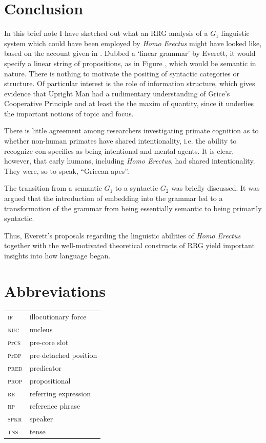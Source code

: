 \documentclass[output=paper,colorlinks,citecolor=brown]{langscibook}
\begin{document}
\section{Conclusion}\label{sec:vanvalin:6}
In this brief note I have sketched out what an RRG analysis of a $G_1$ linguistic system which could have been employed by \emph{Homo Erectus} might have looked like, based on the account given in \citet{everett2017language}.  Dubbed a ‘linear grammar’ by Everett, it would specify a linear string of propositions, as in Figure , which would be semantic in nature.  There is nothing to motivate the positing of syntactic categories or structure.  Of particular interest is the role of information structure, which gives evidence that Upright Man had a rudimentary understanding of Grice’s Cooperative Principle and at least the the maxim of quantity, since it underlies the important notions of topic and focus.  

There is little agreement among researchers investigating primate cognition as to whether non-human primates have shared intentionality, i.e. the ability to recognize con-specifics as being intentional and mental agents.  It is clear, however, that early humans, including \emph{Homo Erectus}, had shared intentionality.  They were, so to speak, “Gricean apes”.

The transition from a semantic $G_1$ to a syntactic $G_2$ was briefly discussed.  It was argued that the introduction of embedding into the grammar led to a transformation of the grammar from being essentially semantic to being primarily syntactic.

Thus, Everett’s proposals regarding the linguistic abilities of \emph{Homo Erectus} together with the well-motivated theoretical constructs of RRG yield important insights into how language began.

\section*{Abbreviations}
\begin{tabularx}{.5\textwidth}{@{}lQ@{}}
\textsc{if} & illocutionary force \\
\textsc{nuc} & nucleus \\
\textsc{p}r\textsc{cs} & pre-core slot \\
\textsc{p}r\textsc{dp} & pre-detached position \\
\textsc{pred} & predicator \\
\textsc{prop} & propositional \\
\textsc{re} & referring expression \\
\textsc{rp} & reference phrase \\
\textsc{spkr} & speaker \\
\textsc{tns} & tense \\
\end{tabularx}

\printbibliography[heading=subbibliography,notkeyword=this]
\end{document}
